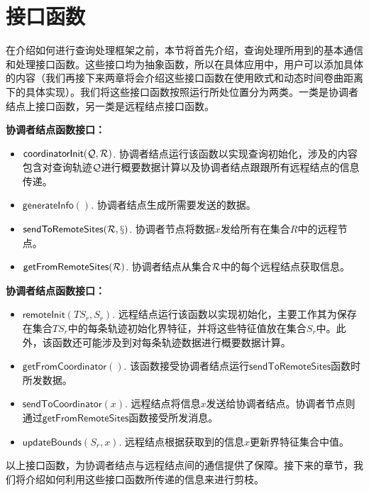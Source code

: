 \section{接口函数}\label{sec-c3-interface}
在介绍如何进行查询处理框架之前，本节将首先介绍，查询处理所用到的基本通信和处理接口函数。这些接口均为抽象函数，所以在具体应用中，用户可以添加具体的内容（我们再接下来两章将会介绍这些接口函数在使用欧式和动态时间卷曲距离下的具体实现）。我们将这些接口函数按照运行所处位置分为两类。一类是协调者结点上接口函数，另一类是远程结点接口函数。

\textbf{协调者结点函数接口：}
\begin{itemize}
	\item  $\textsf{coordinatorInit}({\cal Q}, {\cal R})$.
	协调者结点运行该函数以实现查询初始化，涉及的内容包含对查询轨迹$\cal Q$进行概要数据计算以及协调者结点跟跟所有远程结点的信息传递。
	
		\item $\textsf{generateInfo}()$. 
		协调者结点生成所需要发送的数据。
	
	
	\item  $\textsf{sendToRemoteSites}(\cal R, x)$.
	协调者节点将数据$x$发给所有在集合$R$中的远程节点。

		\item $\textsf{getFromRemoteSites}(\cal R)$.
		协调者结点从集合$\cal R$中的每个远程结点获取信息。
\end{itemize}	

\textbf{协调者结点函数接口：}
\begin{itemize}
		\item $\textsf{remoteInit}(TS_{r} , S_{r})$.
		远程结点运行该函数以实现初始化，主要工作其为保存在集合$TS_{r}$中的每条轨迹初始化界特征，并将这些特征值放在集合$S_{r}$中。此外，该函数还可能涉及到对每条轨迹数据进行概要数据计算。
		
			\item $\textsf{getFromCoordinator}()$. 
			该函数接受协调者结点运行$\textsf{sendToRemoteSites}$函数时所发数据。
		
			\item $\textsf{sendToCoordinator}(x)$.
			远程结点将信息$x$发送给协调者结点。协调者节点则通过$\textsf{getFromRemoteSites}$函数接受所发消息。
		
			\item $\textsf{updateBounds}(S_r, x)$.
		远程结点根据获取到的信息$x$更新界特征集合中值。
\end{itemize}	
	以上接口函数，为协调者结点与远程结点间的通信提供了保障。接下来的章节，我们将介绍如何利用这些接口函数所传递的信息来进行剪枝。

